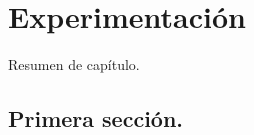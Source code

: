 \chapter{Experimentación}
	\label{sec:exp}
	Resumen de capítulo.

	\section{Primera sección.}
		\label{sec:ExpRect}

